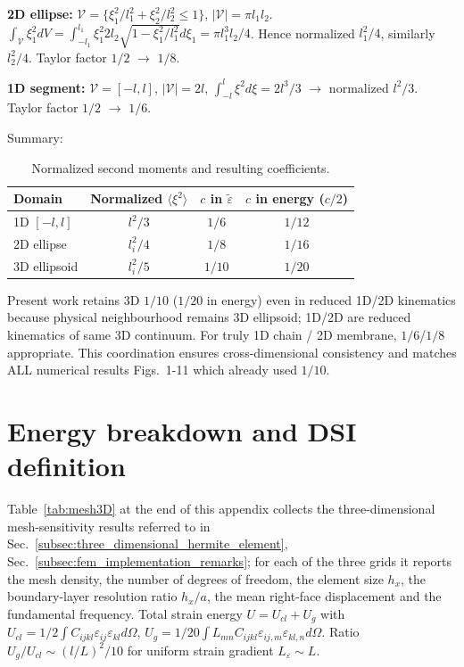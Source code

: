 \documentclass[final,3p,times,fleqn]{elsarticle}
\begin{document}
\textbf{2D ellipse:} $\mathcal{V}=\{\xi_1^2/l_1^2+\xi_2^2/l_2^2\le1\}$, $|\mathcal{V}|=\pi l_1l_2$. $\int_{\mathcal{V}} \xi_1^2 dV = \int_{-l_1}^{l_1} \xi_1^2 2 l_2\sqrt{1-\xi_1^2/l_1^2} d\xi_1 = \pi l_1^3 l_2/4$. Hence normalized $l_1^2/4$, similarly $l_2^2/4$. Taylor factor $1/2$ $\rightarrow$ $1/8$.

\textbf{1D segment:} $\mathcal{V}=[-l,l]$, $|\mathcal{V}|=2l$, $\int_{-l}^{l}\xi^2 d\xi =2l^3/3$ $\rightarrow$ normalized $l^2/3$. Taylor factor $1/2$ $\rightarrow$ $1/6$.

Summary:
\begin{table}[h]
\centering
\caption{Normalized second moments and resulting coefficients.}
\label{tab:coeffs}
\begin{tabular}{lccc}
\hline
Domain & Normalized $\langle\xi^2\rangle$ & $c$ in $\tilde{\varepsilon}$ & $c$ in energy ($c/2$) \\
\hline
1D $[-l,l]$ & $l^2/3$ & $1/6$ & $1/12$ \\
2D ellipse & $l_i^2/4$ & $1/8$ & $1/16$ \\
3D ellipsoid & $l_i^2/5$ & $1/10$ & $1/20$ \\
\hline
\end{tabular}
\end{table}

Present work retains 3D $1/10$ ($1/20$ in energy) even in reduced 1D/2D kinematics because physical neighbourhood remains 3D ellipsoid; 1D/2D are reduced kinematics of same 3D continuum. For truly 1D chain / 2D membrane, $1/6$/$1/8$ appropriate. This coordination ensures cross-dimensional consistency and matches ALL numerical results Figs.~1-11 which already used $1/10$.

\section{Energy breakdown and DSI definition}
\label{app:energy}
Table~\ref{tab:mesh3D} at the end of this appendix collects the
three-dimensional mesh-sensitivity results referred to in
Sec.~\ref{subsec:three_dimensional_hermite_element},
Sec.~\ref{subsec:fem_implementation_remarks}; for each of the three grids it
reports the mesh density, the number of degrees of freedom, the element
size $h_{x}$, the boundary-layer resolution ratio $h_{x}/a$, the mean
right-face displacement and the fundamental frequency. Total strain energy $U=U_{cl}+U_{g}$ with $U_{cl}=1/2\int C_{ijkl}\varepsilon_{ij}\varepsilon_{kl}d\Omega$, $U_g=1/20\int L_{mn}C_{ijkl}\varepsilon_{ij,m}\varepsilon_{kl,n}d\Omega$. Ratio $U_g/U_{cl}\sim (l/L)^2/10$ for uniform strain gradient $L_\varepsilon\sim L$.
\end{document}
